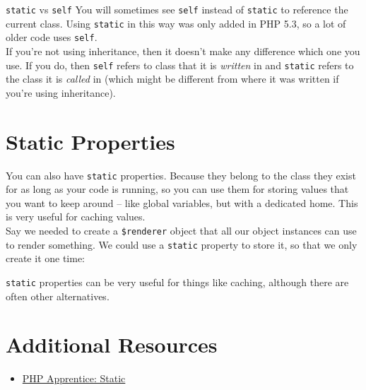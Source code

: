 
\begin{infobox}{\texttt{static} vs \texttt{self}}
    You will sometimes see \texttt{self} instead of \texttt{static} to reference the current class. Using \texttt{static} in this way was only added in PHP 5.3, so a lot of older code uses \texttt{self}.
    \\

    If you're not using inheritance, then it doesn't make any difference which one you use. If you do, then \texttt{self} refers to class that it is \textit{written} in and \texttt{static} refers to the class it is \textit{called} in (which might be different from where it was written if you're using inheritance).
\end{infobox}


\section{Static Properties}

You can also have \texttt{static} properties. Because they belong to the class they exist for as long as your code is running, so you can use them for storing values that you want to keep around – like global variables, but with a dedicated home. This is very useful for caching values.
\\

Say we needed to create a \texttt{\$renderer} object that all our object instances can use to render\textellipsis{} something. We could use a \texttt{static} property to store it, so that we only create it one time:


\texttt{static} properties can be very useful for things like caching, although there are often other alternatives.


\section{Additional Resources}

\begin{itemize}[leftmargin=*]
    \item \href{https://phpapprentice.com/static.html}{PHP Apprentice: Static}
\end{itemize}
